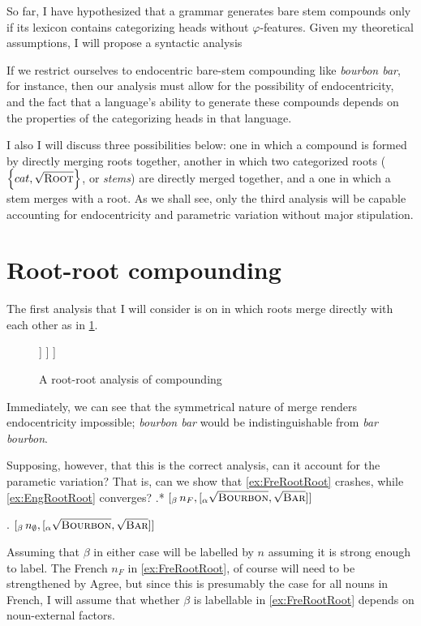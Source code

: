 \documentclass[MilwayThesis]{subfiles}
\begin{document}
So far, I have hypothesized that a grammar generates bare stem compounds only if its lexicon contains categorizing heads without $\varphi$-features.
Given my theoretical assumptions, I will propose a syntactic analysis

If we restrict ourselves to endocentric bare-stem compounding like \textit{bourbon bar}, for instance, then our analysis must allow for the possibility of endocentricity, and the fact that a language's ability to generate these compounds depends on the properties of the categorizing heads in that language.

I also 
I will discuss three possibilities below:
	one in which a compound is formed by directly merging roots together,
	another in which two categorized roots ($\left\{ cat, \sqrt{\textsc{Root}} \right\}$, or \textit{stems}) are directly merged together,
	and a one in which a stem merges with a root.
As we shall see, only the third analysis will be capable accounting for endocentricity and parametric variation without major stipulation.
\section{Root-root compounding}
The first analysis that I will consider is on in which roots merge directly with each other as in \cref{fig:RootRoot}.
\begin{figure}[h]
	\centering
	\begin{forest}
		[$\beta$
			[$n$]
			[$\alpha$
				[$\sqrt{\textsc{Bourbon}}$]
				[$\sqrt{\textsc{Bar}}$]
			]
		]
	]
	\end{forest}
	\caption{A root-root analysis of compounding}
	\label{fig:RootRoot}
\end{figure}
Immediately, we can see that the symmetrical nature of merge renders endocentricity impossible; \textit{bourbon bar} would be indistinguishable from \textit{bar bourbon}.

Supposing, however, that this is the correct analysis, can it account for the parametic variation?
That is, can we show that \cref{ex:FreRootRoot} crashes, while \cref{ex:EngRootRoot} converges?
\ex.* $[_{\beta}\, n_{F}, [_{\alpha} \sqrt{\textsc{Bourbon}}, \sqrt{\textsc{Bar}}  ]  ]$ \label{ex:FreRootRoot}

\ex. $[_{\beta}\, n_{\emptyset}, [_{\alpha} \sqrt{\textsc{Bourbon}}, \sqrt{\textsc{Bar}}  ]  ]$ \label{ex:EngRootRoot}

Assuming that $\beta$ in either case will be labelled by $n$ assuming it is strong enough to label.
The French $n_{F}$ in \cref{ex:FreRootRoot}, of course will need to be strengthened by Agree, but since this is presumably the case for all nouns in French, I will assume that whether $\beta$ is labellable in \cref{ex:FreRootRoot} depends on noun-external factors.
\end{document}
